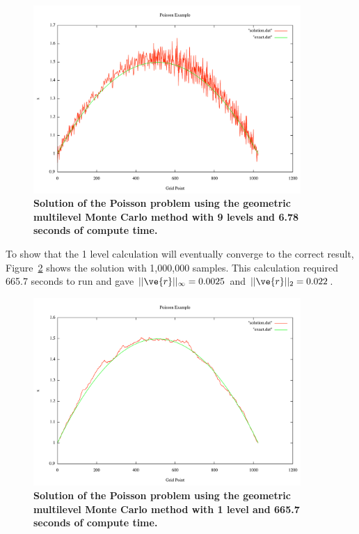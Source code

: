 \documentclass[note]{TechNote}
\begin{document}
\begin{figure}[h!]
  \begin{center}
    \includegraphics[width=4in]{7_sec_9_level.pdf}
  \end{center}
  \caption{\textbf{Solution of the Poisson problem using the geometric
      multilevel Monte Carlo method with 9 levels and 6.78 seconds of
      compute time.}}
  \label{fig:7_sec_9_level}
\end{figure}
To show that the 1 level calculation will eventually converge to the
correct result, Figure~\ref{fig:converged_1_level} shows the solution
with 1,000,000 samples. This calculation required 665.7 seconds to run
and gave $||\ve{r}||_\infty = 0.0025$ and $||\ve{r}||_2 = 0.022$.
\begin{figure}[h!]
  \begin{center}
    \includegraphics[width=4in]{converged_1_level.pdf}
  \end{center}
  \caption{\textbf{Solution of the Poisson problem using the geometric
      multilevel Monte Carlo method with 1 level and 665.7 seconds of
      compute time.}}
  \label{fig:converged_1_level}
\end{figure}
\end{document}
